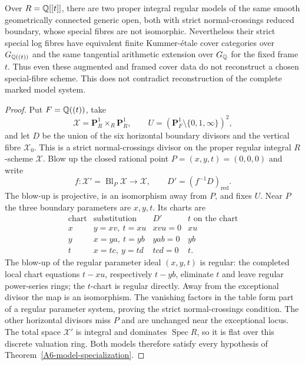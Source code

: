\begin{proposition}
\label{A6-special-fibre-counterexample}
Over $R={\mathbb{Q}}[[t]]$, there are two proper integral regular models of the
same smooth geometrically connected generic open, both with strict
normal-crossings reduced boundary, whose special fibres are not
isomorphic. Nevertheless their strict special log fibres have equivalent
finite Kummer-\'etale cover categories over $G_{{\mathbb{Q}}((t))}$ and the same
tangential arithmetic extension over $G_{\mathbb{Q}}$ for the fixed frame $t$.
Thus even these augmented and framed cover data do not reconstruct a
chosen special-fibre scheme. This does not contradict reconstruction of
the complete marked model system.
\end{proposition}
\begin{proof}
Put $F={\mathbb{Q}}((t))$, take
\[
 \mathcal X=\mathbf P^1_R\times_R\mathbf P^1_R,
 \qquad
 U=(\mathbf P^1_F\setminus\{0,1,\infty\})^2,
\]
and let $D$ be the union of the six horizontal boundary divisors and
the vertical fibre $\mathcal X_0$. This is a strict normal-crossings
divisor on the proper regular integral $R$-scheme $\mathcal X$.
Blow up the closed rational point $P=(x,y,t)=(0,0,0)$ and write
\[
 f:\mathcal X' =\operatorname{Bl}_P\mathcal X\longrightarrow\mathcal X,
 \qquad D'=(f^{-1}D)_{\mathrm{red}}.
\]
The blow-up is projective, is an isomorphism away from $P$, and fixes
$U$. Near $P$ the three boundary parameters are $x,y,t$. Its charts are
\[
 \begin{array}{c|c|c|c}
 \text{chart}&\text{substitution}&D'&t\text{ on the chart}\\\hline
 x&y=xv,\ t=xu&xvu=0&xu\\
 y&x=ya,\ t=yb&yab=0&yb\\
 t&x=tc,\ y=td&tcd=0&t .
 \end{array}
\]
The blow-up of the regular parameter ideal $(x,y,t)$ is regular:
the completed local chart equations $t-xu$, respectively $t-yb$,
eliminate $t$ and leave regular power-series rings; the $t$-chart is
regular directly. Away from the exceptional divisor the map is
an isomorphism. The vanishing factors in the table form part of a
regular parameter system, proving the strict normal-crossings
condition. The other horizontal divisors miss $P$ and are unchanged
near the exceptional locus. The total space $\mathcal X'$ is integral
and dominates $\operatorname{Spec}R$, so it is flat over this discrete
valuation ring. Both models therefore satisfy every hypothesis of
Theorem~\ref{A6-model-specialization}.


\end{proof}
